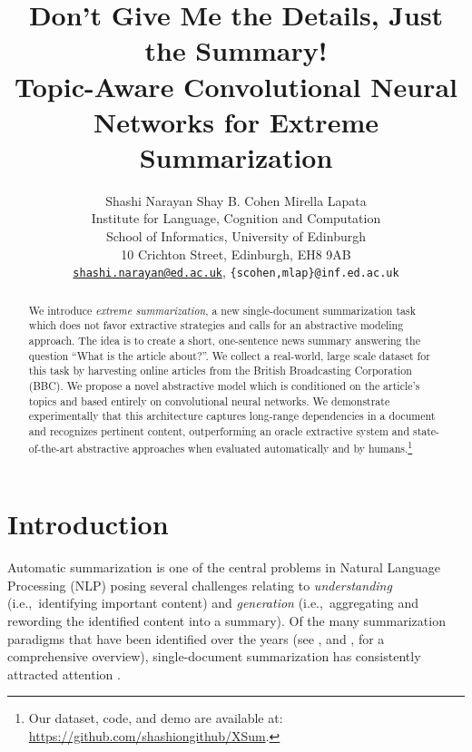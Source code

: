 \documentclass[11pt,a4paper]{article}
\title{Don't Give Me the Details, Just the Summary! \\Topic-Aware
  Convolutional Neural Networks for Extreme Summarization}
\author{Shashi Narayan \quad Shay B. Cohen \quad Mirella Lapata \\ 
  Institute for Language, Cognition and Computation \\
  School of Informatics, University of Edinburgh \\ 
  10 Crichton Street, Edinburgh, EH8 9AB  \\ 
  \texttt{\url{shashi.narayan@ed.ac.uk}},
  \texttt{\{scohen,mlap\}@inf.ed.ac.uk} 
}
\date{}
\begin{document}
\maketitle
\begin{abstract}

  We introduce \emph{extreme summarization}, a new single-document
  summarization task which does not favor extractive strategies and
  calls for an abstractive modeling approach. The idea is to create a
  short, one-sentence news summary answering the question ``What is
  the article about?''. We collect a real-world, large scale dataset
  for this task by harvesting online articles from the British
  Broadcasting Corporation (BBC). We propose a novel abstractive model
  which is conditioned on the article's topics and based entirely on
  convolutional neural networks.  We demonstrate experimentally that
  this architecture captures long-range dependencies in a document and
  recognizes pertinent content, outperforming an oracle extractive
  system and state-of-the-art abstractive approaches when evaluated
  automatically and by humans.\footnote{Our dataset, code, and demo
    are available at: \url{https://github.com/shashiongithub/XSum}.}

\end{abstract}

\section{Introduction}

Automatic summarization is one of the central problems in Natural
Language Processing (NLP) posing several challenges relating to {\em
  understanding} (i.e.,~identifying important content) and {\em
  generation} (i.e.,~aggregating and rewording the identified
content into a summary). Of the many summarization paradigms that have
been identified over the years (see \citeauthor{mani2001automatic},
\citeyear{mani2001automatic} and \citeauthor{Nenkova:McKeown:2011},
\citeyear{Nenkova:McKeown:2011} for a comprehensive overview),
single-document summarization has consistently attracted attention
\cite{jp-acl16,durrett-nyt-ext,nallapati-signll16,nallapati17,see-acl17,tanwan-acl17,narayan-arxiv17,Fan2017Controllable,paulus-socher-arxiv17,Pasunuru-multireward18,asli-multiagent18,narayan-sidenet18,narayan-rank18}.
\end{document}
